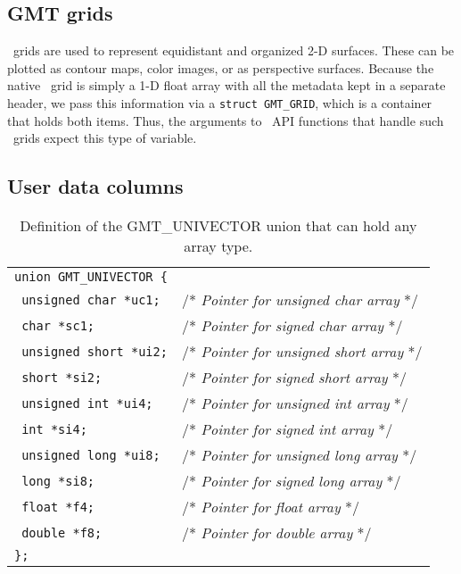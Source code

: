 \documentclass{report}
\begin{document}
\subsection{GMT grids}

\GMT\ grids are used to represent equidistant and organized 2-D surfaces.  These can be
plotted as contour maps, color images, or as perspective surfaces.  Because the native
\GMT\ grid is simply a 1-D float array with all the metadata kept in a separate header, we
pass this information via a \texttt{struct GMT\_GRID}, which is a container that holds both items.
Thus, the arguments to \GMT\ API functions that handle such \GMT\ grids expect this type
of variable.

\subsection{User data columns}

\begin{table}[h]
\small
\centering
\begin{tabular}{ll} \hline
\multicolumn{2}{l}{\texttt{union GMT\_UNIVECTOR \{}} \\ 
\texttt{	unsigned char *uc1;}	&       /* \emph{Pointer for unsigned char array} */ \\
\texttt{	char *sc1;}		&       /* \emph{Pointer for signed char array} */ \\
\texttt{	unsigned short *ui2;}	&       /* \emph{Pointer for unsigned short array} */ \\
\texttt{	short *si2;}		&       /* \emph{Pointer for signed short array} */ \\
\texttt{	unsigned int *ui4;}	&       /* \emph{Pointer for unsigned int array} */ \\
\texttt{	int *si4;}		&       /* \emph{Pointer for signed int array} */ \\
\texttt{	unsigned long *ui8;}	&       /* \emph{Pointer for unsigned long array} */ \\
\texttt{	long *si8;}		&       /* \emph{Pointer for signed long array} */ \\
\texttt{	float *f4;}		&       /* \emph{Pointer for float array} */ \\
\texttt{	double *f8;}		&       /* \emph{Pointer for double array} */ \\
\texttt{\};}	&        \\  \hline
\end{tabular}
\caption{Definition of the GMT\_UNIVECTOR union that can hold any array type.}
\label{tbl:univector}
\end{table}
\end{document}
